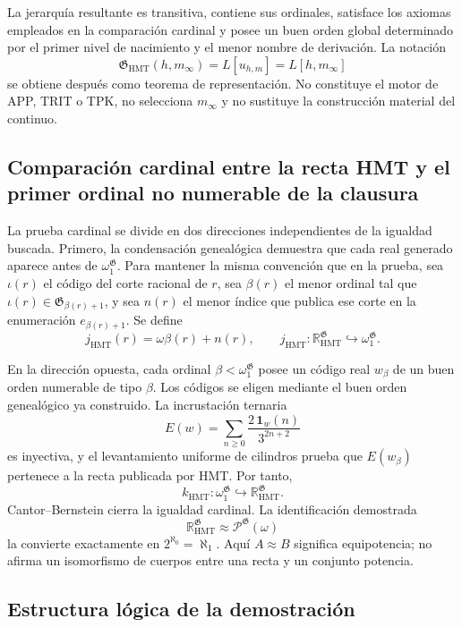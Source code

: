 La jerarquía resultante es transitiva, contiene sus ordinales, satisface los
axiomas empleados en la comparación cardinal y posee un buen orden global
determinado por el primer nivel de nacimiento y el menor nombre de derivación.
La notación
\[
 \mathfrak G_{\mathrm{HMT}}(h,m_\infty)
 =L[u_{h,m}]=L[h,m_\infty]
\]
se obtiene después como teorema de representación. No constituye el motor de
APP, TRIT o TPK, no selecciona \(m_\infty\) y no sustituye la construcción
material del continuo.

\subsection{Comparación cardinal entre la recta HMT y el primer ordinal no numerable de la clausura}

La prueba cardinal se divide en dos direcciones independientes de la igualdad
buscada. Primero, la condensación genealógica demuestra que cada real generado
aparece antes de \(\omega_1^{\mathfrak G}\). Para mantener la misma
convención que en la prueba, sea \(\iota(r)\) el código del corte racional
de \(r\), sea \(\beta(r)\) el menor ordinal tal que
\(\iota(r)\in\mathfrak G_{\beta(r)+1}\), y sea \(n(r)\) el menor índice
que publica ese corte en la enumeración \(e_{\beta(r)+1}\). Se define
\[
 j_{\mathrm{HMT}}(r)=\omega\beta(r)+n(r),
 \qquad
 j_{\mathrm{HMT}}:
 \mathbb R_{\mathrm{HMT}}^{\mathfrak G}
 \hookrightarrow\omega_1^{\mathfrak G}.
\]

En la dirección opuesta, cada ordinal
\(\beta<\omega_1^{\mathfrak G}\) posee un código real \(w_\beta\) de un buen
orden numerable de tipo \(\beta\). Los códigos se eligen mediante el buen
orden genealógico ya construido. La incrustación ternaria
\[
 E(w)=\sum_{n\geq0}\frac{2\,\mathbf 1_w(n)}{3^{2n+2}}
\]
es inyectiva, y el levantamiento uniforme de cilindros prueba que
\(E(w_\beta)\) pertenece a la recta publicada por HMT. Por tanto,
\[
 k_{\mathrm{HMT}}:
 \omega_1^{\mathfrak G}
 \hookrightarrow\mathbb R_{\mathrm{HMT}}^{\mathfrak G}.
\]
Cantor--Bernstein cierra la igualdad cardinal. La identificación demostrada
\[
 \mathbb R_{\mathrm{HMT}}^{\mathfrak G}
 \approx\mathcal P^{\mathfrak G}(\omega)
\]
la convierte exactamente en \(2^{\aleph_0}=\aleph_1\). Aquí
\(A\approx B\) significa equipotencia; no afirma un isomorfismo de cuerpos
entre una recta y un conjunto potencia.

\clearpage
\subsection{Estructura lógica de la demostración}

